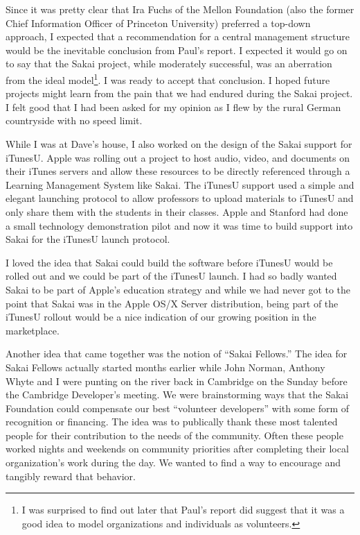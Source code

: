 \documentclass[12pt]{book}
\begin{document}
Since it was pretty clear that Ira Fuchs of the Mellon Foundation
(also the former Chief Information Officer of Princeton University)
preferred a top-down approach, I expected that a recommendation for a
central management structure would be the inevitable conclusion
from Paul's report.  I expected it would go on to say that
the Sakai project, while moderately successful, was an aberration
from the ideal model\footnote{I was surprised to find out
later that Paul's report did suggest that it was a good idea
to model organizations and individuals as volunteers.}.
I was ready to accept that conclusion.  I hoped future projects
might learn from the pain that we had endured during the Sakai
project.
I felt good that I had been asked for my opinion as I flew
by the rural German countryside with no speed limit.

While I was at Dave's house, I also worked on the design of the
Sakai support for iTunesU.  Apple was rolling out a project to
host audio, video, and documents on their iTunes servers and allow
these resources to be directly referenced through a Learning Management
System like Sakai.  The iTunesU support used a simple and elegant
launching protocol to allow professors to upload materials
to iTunesU and only share them with the students in their classes.
Apple and Stanford had done a small technology demonstration pilot
and now it was time to build support into Sakai for the iTunesU
launch protocol.

I loved the idea that Sakai could build the software before iTunesU
would be rolled out and we could be part of the iTunesU launch.
I had so badly wanted Sakai to be part of Apple's education strategy
and while we had never got to the point that Sakai was in the Apple
OS/X Server distribution, being part of the iTunesU rollout would be
a nice indication of our growing position in the marketplace.

Another idea that came together was the notion of ``Sakai Fellows.''
The idea for Sakai Fellows actually started months earlier while
John Norman, Anthony Whyte and I were punting on the river back
in Cambridge on the Sunday before the Cambridge Developer's meeting.
We were brainstorming ways that the Sakai Foundation
could compensate our best ``volunteer developers'' with some form
of recognition or financing.  The idea was to publically thank
these most talented people for their
contribution to the needs of the community.
Often these people worked nights and
weekends on community priorities after completing their local
organization's work during the day.  We wanted to find a way
to encourage and tangibly reward that behavior.
\end{document}

